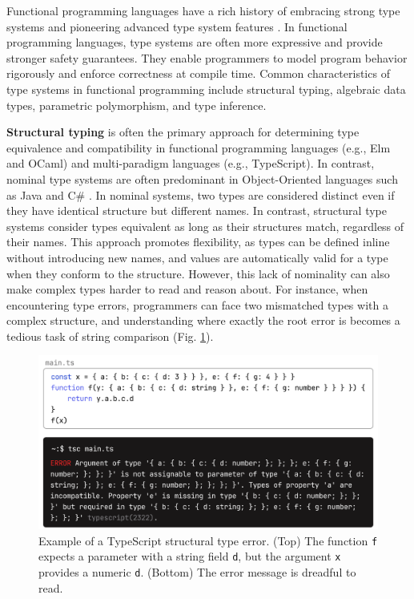 \documentclass[preprint,12pt]{elsarticle}
\begin{document}
Functional programming languages have a rich history of embracing strong type systems and pioneering advanced type system features \cite{Milner1978-ob, MacQueen2020-qn, Hudak2007-kn}. In functional programming languages, type systems are often more expressive and provide stronger safety guarantees. They enable programmers to model program behavior rigorously and enforce correctness at compile time. Common characteristics of type systems in functional programming include structural typing, algebraic data types, parametric polymorphism, and type inference.

{\bf Structural typing} is often the primary approach for determining type equivalence and compatibility in functional programming languages (e.g., Elm and OCaml) and multi-paradigm languages (e.g., TypeScript). In contrast, nominal type systems are often predominant in Object-Oriented languages such as Java and C\# \cite{AbdelGawad2013-hh}. In nominal systems, two types are considered distinct even if they have identical structure but different names. In contrast, structural type systems consider types equivalent as long as their structures match, regardless of their names. This approach promotes flexibility, as types can be defined inline without introducing new names, and values are automatically valid for a type when they conform to the structure.  However, this lack of nominality can also make complex types harder to read and reason about. For instance, when encountering type errors, programmers can face two mismatched types with a complex structure, and understanding where exactly the root error is becomes a tedious task of string comparison (Fig. \ref{fig:structural}).

\begin{figure}[]
  \includegraphics[width=\linewidth]{figures/structural}
  \caption{\label{fig:structural} Example of a TypeScript structural type error. (Top) The function \texttt{f} expects a parameter with a string field \texttt{d}, but the argument {\tt x} provides a numeric {\tt d}. (Bottom) The error message is dreadful to read.}
\end{figure}
\end{document}
